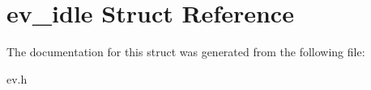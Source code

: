 \hypertarget{structev__idle}{}\section{ev\+\_\+idle Struct Reference}
\label{structev__idle}


The documentation for this struct was generated from the following file\+:\begin{DoxyCompactItemize}
\item 
ev.\+h\end{DoxyCompactItemize}

